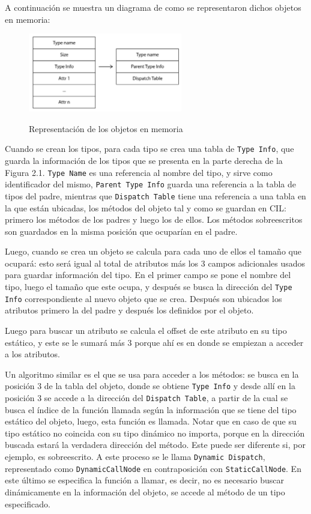 \documentclass[11pt]{scrartcl} %
\begin{document}
A continuación se muestra un diagrama de como se representaron dichos objetos en memoria:

\begin{figure}[h]
	\centering
	\includegraphics[width=0.6\textwidth]{resources/object.png}
	\label{fig:objects}
	\caption{Representación de los objetos en memoria}
\end{figure}

Cuando se crean los tipos, para cada tipo se crea una tabla de \texttt{Type Info}, que guarda la información de los tipos que se presenta en la parte derecha de la Figura 2.1. \texttt{Type Name} es una referencia al nombre del tipo, y sirve como identificador del mismo, \texttt{Parent Type Info} guarda una referencia a la tabla de tipos del padre, mientras que \texttt{Dispatch Table} tiene una referencia a una tabla en la que están ubicadas, los métodos del objeto tal y como se guardan en CIL: primero los métodos de los padres y luego los de ellos. Los métodos sobreescritos son guardados en la misma posición que ocuparían en el padre. 

Luego, cuando se crea un objeto se calcula para cada uno de ellos el tamaño que ocupará: esto será igual al total de atributos más los 3 campos adicionales usados para guardar información del tipo. En el primer campo se pone el nombre del tipo, luego el tamaño que este ocupa, y después se busca la dirección del \texttt{Type Info} correspondiente al nuevo objeto que se crea. Después son ubicados los atributos primero la del padre y después los definidos por el objeto.

Luego para buscar un atributo se calcula el offset de este atributo en su tipo estático, y este se le sumará más 3 porque ahí es en donde se empiezan a acceder a los atributos. 

Un algoritmo similar es el que se usa para acceder a los métodos: se busca en la posición 3 de la tabla del objeto, donde se obtiene \texttt{Type Info} y desde allí en la posición 3 se accede a la dirección del \texttt{Dispatch Table}, a partir de la cual se busca el índice de la función llamada según la información que se tiene del tipo estático del objeto, luego, esta función es llamada.  Notar que en caso de que su tipo estático no coincida con su tipo dinámico no importa, porque en la dirección buscada estará la verdadera dirección del método. Este puede ser diferente si, por ejemplo, es sobreescrito. A este proceso se le llama \texttt{Dynamic Dispatch}, representado como \texttt{DynamicCallNode} en contraposición con \texttt{StaticCallNode}. En este último se especifica la función a llamar, es decir, no es necesario buscar dinámicamente en la información del objeto, se accede al método de un tipo especificado.
\end{document}

